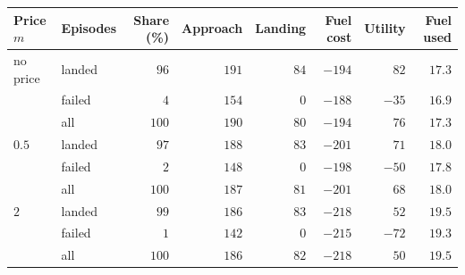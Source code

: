 \begin{tabular}{llrrrrrr}
\toprule
Price $m$ & Episodes & Share (\%) & Approach & Landing & Fuel cost & Utility & Fuel used \\
\midrule
no price & landed & $96$ & $191$ & $84$ & $-194$ & $82$ & $17.3$ \\
 & failed & $4$ & $154$ & $0$ & $-188$ & $-35$ & $16.9$ \\
 & all & $100$ & $190$ & $80$ & $-194$ & $76$ & $17.3$ \\
\addlinespace
$0.5$ & landed & $97$ & $188$ & $83$ & $-201$ & $71$ & $18.0$ \\
 & failed & $2$ & $148$ & $0$ & $-198$ & $-50$ & $17.8$ \\
 & all & $100$ & $187$ & $81$ & $-201$ & $68$ & $18.0$ \\
\addlinespace
$2$ & landed & $99$ & $186$ & $83$ & $-218$ & $52$ & $19.5$ \\
 & failed & $1$ & $142$ & $0$ & $-215$ & $-72$ & $19.3$ \\
 & all & $100$ & $186$ & $82$ & $-218$ & $50$ & $19.5$ \\
\bottomrule
\end{tabular}
